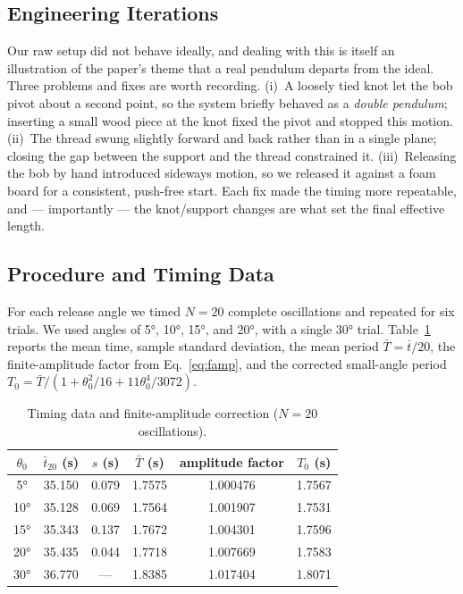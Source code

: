 \documentclass[11pt]{article}
\begin{document}
\subsection{Engineering Iterations}
Our raw setup did not behave ideally, and dealing with this is itself an illustration of
the paper's theme that a real pendulum departs from the ideal. Three problems and fixes
are worth recording. (i)~A loosely tied knot let the bob pivot about a second point, so
the system briefly behaved as a \emph{double pendulum}; inserting a small wood piece at
the knot fixed the pivot and stopped this motion. (ii)~The thread swung slightly forward
and back rather than in a single plane; closing the gap between the support and the thread
constrained it. (iii)~Releasing the bob by hand introduced sideways motion, so we released
it against a foam board for a consistent, push-free start. Each fix made the timing more
repeatable, and --- importantly --- the knot/support changes are what set the final
effective length.

\subsection{Procedure and Timing Data}
For each release angle we timed $N=20$ complete oscillations and repeated for six trials.
We used angles of \ang{5}, \ang{10}, \ang{15}, and \ang{20}, with a single \ang{30} trial.
Table~\ref{tab:timing} reports the mean time, sample standard deviation, the mean period
$\bar{T}=\bar{t}/20$, the finite-amplitude factor from Eq.~\eqref{eq:famp}, and the
corrected small-angle period $T_0 = \bar{T}/(1+\theta_0^2/16+11\theta_0^4/3072)$.

\begin{table}[h]
\centering
\caption{Timing data and finite-amplitude correction ($N=20$ oscillations).}
\label{tab:timing}
\begin{tabular}{cccccc}
\toprule
$\theta_0$ & $\bar{t}_{20}$ (s) & $s$ (s) & $\bar{T}$ (s) & amplitude factor & $T_0$ (s)\\
\midrule
\ang{5}  & 35.150 & 0.079 & 1.7575 & 1.000476 & 1.7567\\
\ang{10} & 35.128 & 0.069 & 1.7564 & 1.001907 & 1.7531\\
\ang{15} & 35.343 & 0.137 & 1.7672 & 1.004301 & 1.7596\\
\ang{20} & 35.435 & 0.044 & 1.7718 & 1.007669 & 1.7583\\
\ang{30} & 36.770 & --- & 1.8385 & 1.017404 & 1.8071\\
\bottomrule
\end{tabular}
\end{table}
\end{document}
